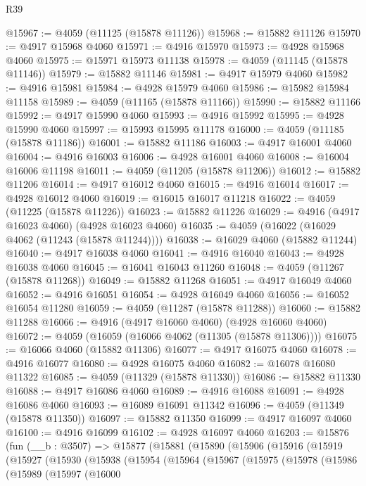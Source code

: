 \begin{lexlean}{R39}
\begin{coremodule}
@15967 := @4059 (@11125 (@15878 @11126))
@15968 := @15882 @11126
@15970 := @4917 @15968 @4060
@15971 := @4916 @15970
@15973 := @4928 @15968 @4060
@15975 := @15971 @15973 @11138
@15978 := @4059 (@11145 (@15878 @11146))
@15979 := @15882 @11146
@15981 := @4917 @15979 @4060
@15982 := @4916 @15981
@15984 := @4928 @15979 @4060
@15986 := @15982 @15984 @11158
@15989 := @4059 (@11165 (@15878 @11166))
@15990 := @15882 @11166
@15992 := @4917 @15990 @4060
@15993 := @4916 @15992
@15995 := @4928 @15990 @4060
@15997 := @15993 @15995 @11178
@16000 := @4059 (@11185 (@15878 @11186))
@16001 := @15882 @11186
@16003 := @4917 @16001 @4060
@16004 := @4916 @16003
@16006 := @4928 @16001 @4060
@16008 := @16004 @16006 @11198
@16011 := @4059 (@11205 (@15878 @11206))
@16012 := @15882 @11206
@16014 := @4917 @16012 @4060
@16015 := @4916 @16014
@16017 := @4928 @16012 @4060
@16019 := @16015 @16017 @11218
@16022 := @4059 (@11225 (@15878 @11226))
@16023 := @15882 @11226
@16029 := @4916 (@4917 @16023 @4060) (@4928 @16023 @4060)
@16035 := @4059 (@16022 (@16029 @4062 (@11243 (@15878 @11244))))
@16038 := @16029 @4060 (@15882 @11244)
@16040 := @4917 @16038 @4060
@16041 := @4916 @16040
@16043 := @4928 @16038 @4060
@16045 := @16041 @16043 @11260
@16048 := @4059 (@11267 (@15878 @11268))
@16049 := @15882 @11268
@16051 := @4917 @16049 @4060
@16052 := @4916 @16051
@16054 := @4928 @16049 @4060
@16056 := @16052 @16054 @11280
@16059 := @4059 (@11287 (@15878 @11288))
@16060 := @15882 @11288
@16066 := @4916 (@4917 @16060 @4060) (@4928 @16060 @4060)
@16072 := @4059 (@16059 (@16066 @4062 (@11305 (@15878 @11306))))
@16075 := @16066 @4060 (@15882 @11306)
@16077 := @4917 @16075 @4060
@16078 := @4916 @16077
@16080 := @4928 @16075 @4060
@16082 := @16078 @16080 @11322
@16085 := @4059 (@11329 (@15878 @11330))
@16086 := @15882 @11330
@16088 := @4917 @16086 @4060
@16089 := @4916 @16088
@16091 := @4928 @16086 @4060
@16093 := @16089 @16091 @11342
@16096 := @4059 (@11349 (@15878 @11350))
@16097 := @15882 @11350
@16099 := @4917 @16097 @4060
@16100 := @4916 @16099
@16102 := @4928 @16097 @4060
@16203 := @15876
    (fun (__b : @3507) =>
    @15877
      (@15881
        (@15890
          (@15906
            (@15916
              (@15919
                (@15927
                  (@15930
                    (@15938
                      (@15954
                        (@15964
                          (@15967
                            (@15975
                              (@15978
                                (@15986
                                  (@15989
                                    (@15997
                                      (@16000

\end{coremodule}
\end{lexlean}
